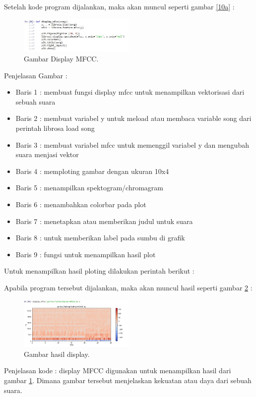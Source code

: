 \begin{enumerate}
	\par Setelah kode program dijalankan, maka akan muncul seperti gambar \ref{10a} :
		\begin{figure}[ht]
		\centerline{\includegraphics[width=0.5\textwidth]{figures/chapter6/no10a.jpg}}
		\caption{Gambar Display MFCC.}
		\label{no10a}
		\end{figure}
	\par Penjelasan Gambar :
	\begin{itemize}
	\item Baris 1 : membuat fungsi display mfcc untuk menampilkan vektorisasi dari sebuah suara
	\item Baris 2 : membuat variabel y untuk meload atau membaca variable song dari perintah librosa load song
	\item Baris 3 : membuat variabel mfcc untuk memenggil variabel y dan mengubah suara menjasi vektor
	\item Baris 4 : memploting gambar dengan ukuran 10x4
	\item Baris 5 : menampilkan spektogram/chromagram
	\item Baris 6 : menambahkan colorbar pada plot
	\item Baris 7 : menetapkan atau memberikan judul untuk suara
	\item Baris 8 : untuk memberikan label pada sumbu di grafik
	\item Baris 9 : fungsi untuk menampilkan hasil plot
	\end{itemize}
	\par Untuk menampilkan hasil ploting dilakukan perintah berikut :
	
	\par Apabila program tersebut dijalankan, maka akan muncul hasil seperti gambar \ref{no10} :
		\begin{figure}[ht]
		\centerline{\includegraphics[width=0.5\textwidth]{figures/chapter6/no10.jpg}}
		\caption{Gambar hasil display.}
		\label{no10}
		\end{figure}
	\par Penjelasan kode : display MFCC digunakan untuk menampilkan hasil dari gambar \ref{no10a}. Dimana gambar tersebut menjelaskan kekuatan atau daya dari sebuah suara.


\end{enumerate}
